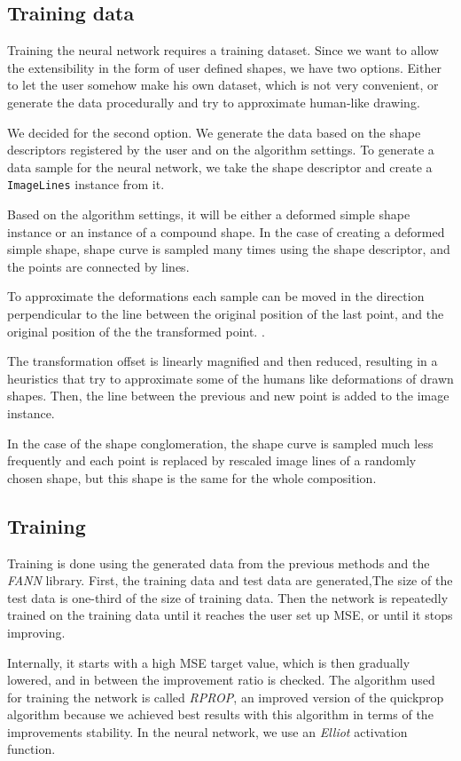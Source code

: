 \subsection{Training data}
Training the neural network requires a training dataset. Since we want to allow the extensibility in the form of user defined shapes, we have two options. Either to let the user somehow make his own dataset, which is not very convenient, or generate the data procedurally and try to approximate human-like drawing.

We decided for the second option. We generate the data based on the shape descriptors registered by the user and on the algorithm settings. To generate a data sample for the neural network, we take the shape descriptor and create a \texttt{ImageLines} instance from it.

Based on the algorithm settings, it will be either a deformed simple shape instance or an instance of a compound shape. In the case of creating a deformed simple shape, shape curve is sampled many times using the shape descriptor, and the points are connected by lines.
 
To approximate the deformations each sample can be moved in the direction perpendicular to the line between the original position of the last point, and the original position of the the transformed point. .

The transformation  offset is linearly magnified and then reduced, resulting in a heuristics that try to approximate some of the humans like deformations of drawn shapes. Then, the line between the previous and new point is added to the image instance. 

In the case of the shape conglomeration, the shape curve is sampled much less frequently and each point is replaced by rescaled image lines of a randomly chosen shape, but this shape is the same for the whole composition. 

\subsection{Training}
Training is done using the generated data from the previous methods and the \emph{FANN} library. 
First, the training data and test data are generated,The size of the test data is one-third of the size of training data. Then the network is repeatedly trained on the training data until it reaches the user set up MSE, or until it stops improving.

Internally, it starts with a high MSE target value, which is then gradually lowered, and in between the improvement ratio is checked. The algorithm used for training the network is called \emph{RPROP}, an improved version of the quickprop algorithm because we achieved best results with this algorithm in terms of the improvements stability. In the neural network, we use an \emph{Elliot} activation function.

